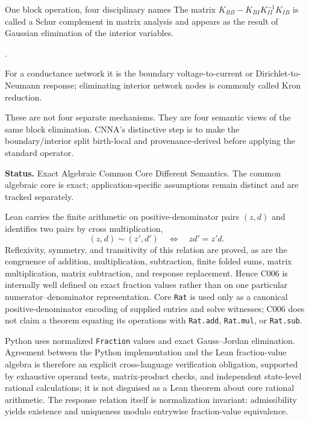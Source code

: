 \begin{cnnaInfoBox}{One block operation, four disciplinary names}
\label{box:c006-four-names-infobox}
The matrix $K_{BB}-K_{BI}K_{II}^{-1}K_{IB}$ is called a Schur complement in matrix analysis and appears as the result of Gaussian elimination of the interior variables.

\cite[Sec.~I, pp.~150--151]{DoerflerBullo2013KronReduction}.

For a conductance network it is the boundary voltage-to-current or Dirichlet-to-Neumann response; eliminating interior network nodes is commonly called Kron reduction.

These are not four separate mechanisms.  They are four semantic views of the same block elimination.  CNNA's distinctive step is to make the boundary/interior split birth-local and provenance-derived before applying the standard operator.

\textbf{Status.} Exact Algebraic Common Core Different Semantics. The common algebraic core is exact; application-specific assumptions remain distinct and are tracked separately.
\end{cnnaInfoBox}


Lean carries the finite arithmetic on positive-denominator pairs $(z,d)$ and
identifies two pairs by cross multiplication,
\[
 (z,d)\sim(z',d')\quad\Longleftrightarrow\quad zd'=z'd.
\]
Reflexivity, symmetry, and transitivity of this relation are proved, as are the
congruence of addition, multiplication, subtraction, finite folded sums,
matrix multiplication, matrix subtraction, and response replacement.  Hence
C006 is internally well defined on exact fraction values rather than on one
particular numerator--denominator representation.  Core \texttt{Rat} is used
only as a canonical positive-denominator encoding of supplied entries and solve
witnesses; C006 does not claim a theorem equating its operations with
\texttt{Rat.add}, \texttt{Rat.mul}, or \texttt{Rat.sub}.

Python uses normalized \texttt{Fraction} values and exact Gauss--Jordan
elimination.  Agreement between the Python implementation and the Lean
fraction-value algebra is therefore an explicit cross-language verification
obligation, supported by exhaustive operand tests, matrix-product checks, and
independent state-level rational calculations; it is not disguised as a Lean
theorem about core rational arithmetic.  The response relation itself is
normalization invariant: admissibility yields existence and uniqueness modulo
entrywise fraction-value equivalence.

